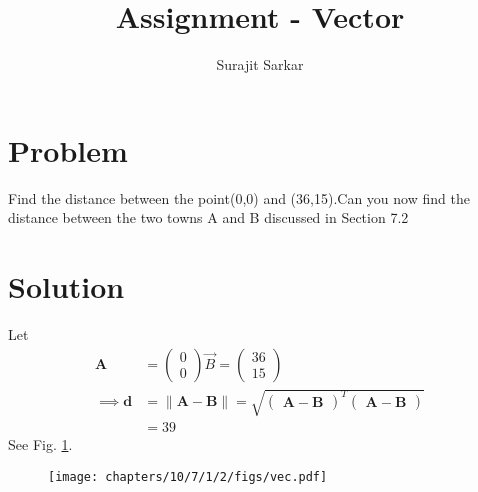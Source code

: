 \documentclass[journal,12pt,twocolumn]{IEEEtran}
\title{\mytitle}
\title{
Assignment - Vector
}
\author{Surajit Sarkar}
\newcommand{\myvec}[1]{\ensuremath{\begin{pmatrix}#1\end{pmatrix}}}
\providecommand{\norm}[1]{\lVert#1\rVert}
\let\vec\mathbf
\begin{document}
\maketitle
\tableofcontents
\bigskip
\section{\textbf{Problem}}
Find the distance between the point(0,0) and (36,15).Can you now find the distance between the two towns A and B discussed in Section 7.2
\section{\textbf{Solution}}
\fi
Let
\begin{align}
\vec{A}&=\myvec{0 \\ 0}  
\Vec{B}=\myvec{36 \\ 15} \\ 
\implies 
\vec{d}&=\norm{\vec{A}-\vec{B}}=\sqrt{\myvec{\vec{A}-\vec{B}}^T\myvec{\vec{A}-\vec{B}}} \\
&=39
\end{align}
See Fig. 
\ref{fig:10/7/1/2vec}.
\begin{figure}[H]
\centering
\texttt{[image: chapters/10/7/1/2/figs/vec.pdf]}
\caption{}
\label{fig:10/7/1/2vec}
\end{figure}
\end{document}
